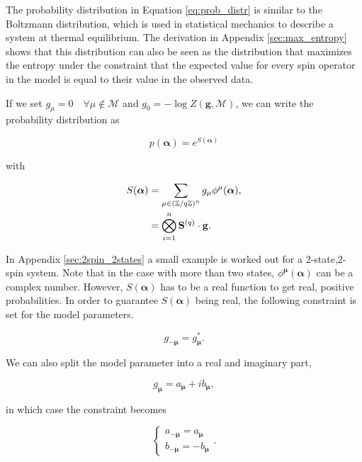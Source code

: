 \noindent
The probability distribution in Equation \ref{eq:prob_distr} is similar to the Boltzmann distribution, which is used in statistical mechanics to describe a system at thermal equilibrium.
The derivation in Appendix \ref{sec:max_entropy} shows that this distribution can also be seen as the distribution that maximizes the entropy under the constraint that the expected value for every spin operator in the model is equal to their value in the observed data.

\noindent
If we set $g_\mu = 0 \quad \forall \mu \notin \mathcal{M}$ and $g_0 = -\log Z(\mathbf{g}, \mathcal{M})$, we can write the probability distribution as

\begin{equation}
    p(\boldsymbol{\alpha}) =e^{S(\boldsymbol{\alpha})}
\end{equation}

\noindent
with

\begin{align}
    S(\boldsymbol{\alpha}) &= \sum_{\mu \in {(\mathbb{Z}/q\mathbb{Z})}^n} g_\mu \phi^\mu(\boldsymbol{\alpha}),\notag \\
    &= \bigotimes_{i = 1}^{n} \mathbf{S}^{(q)} \cdot \mathbf{g}.\label{eq:s_alpha}
\end{align}

\noindent
In Appendix \ref{sec:2spin_2states} a small example is worked out for a 2-state,2-spin system.
Note that in the case with more than two states, $\phi^{\boldsymbol{\mu}}(\boldsymbol{\alpha})$ can be a complex number. However, $S(\boldsymbol{\alpha})$ has to be a real function to get real, positive probabilities.
In order to guarantee $S(\boldsymbol{\alpha})$ being real, the following constraint is set for the model parameters.

\begin{equation}
    g_{-\boldsymbol{\mu}} = g_{\boldsymbol{\mu}}^*.
\end{equation}

\noindent
We can also split the model parameter into a real and imaginary part,

\begin{equation}
    g_{\boldsymbol{\mu}} = a_{\boldsymbol{\mu}} + i b_{\boldsymbol{\mu}},
\end{equation}

\noindent
in which case the constraint becomes

\begin{equation}
    \begin{cases}
        a_{-\boldsymbol{\mu}} = a_{\boldsymbol{\mu}}\\
        b_{-\boldsymbol{\mu}} = -b_{\boldsymbol{\mu}}
    \end{cases}
    .
\end{equation}

